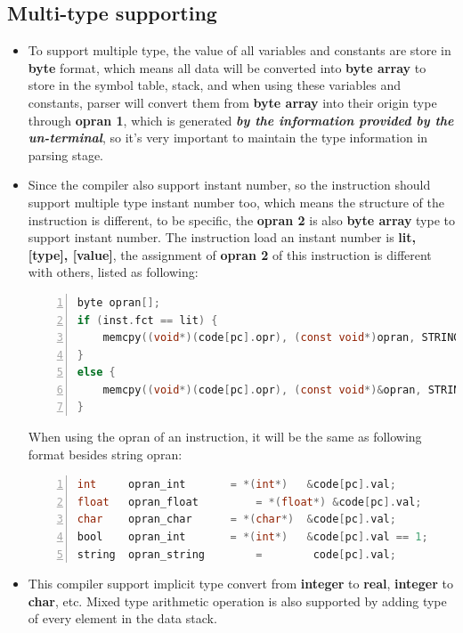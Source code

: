 \documentclass{article}
\begin{document}
		\subsection{Multi-type supporting}
		\begin{itemize}
		\item To support multiple type, the value of all variables and constants are store in \textbf{byte} format, which means all data will be converted into \textbf{byte array} to store in the symbol table, stack, and when using these variables and constants, parser will convert them from \textbf{byte array} into their origin type through \textbf{opran 1}, which is generated \textbf{\emph{by the information provided by the un-terminal}}, so it's very important to maintain the type information in parsing stage.\\
		\item Since the compiler also support instant number, so the instruction should support multiple type instant number too, which means the structure of the instruction is different, to be specific, the \textbf{opran 2} is also \textbf{byte array} type to support instant number. The instruction load an instant number is \textbf{lit, [type], [value]}, the assignment of \textbf{opran 2} of this instruction is different with others, listed as following:\\
		\begin{lstlisting}[language={C},numbers=left,numberstyle=\tiny,%frame=shadowbox,  
   rulesepcolor=\color{red!20!green!20!blue!20},  
   keywordstyle=\color{blue!70!black},  
   commentstyle=\color{blue!90!},  
   basicstyle=\ttfamily]  
byte opran[];
if (inst.fct == lit) {
	memcpy((void*)(code[pc].opr), (const void*)opran, STRING_LEN);
}
else {
	memcpy((void*)(code[pc].opr), (const void*)&opran, STRING_LEN);
}
		\end{lstlisting}
		When using the opran of an instruction, it will be the same as following format besides string opran:\\
		\begin{lstlisting}[language={C},numbers=left,numberstyle=\tiny,%frame=shadowbox,  
   rulesepcolor=\color{red!20!green!20!blue!20},  
   keywordstyle=\color{blue!70!black},  
   commentstyle=\color{blue!90!},  
   basicstyle=\ttfamily]  
int 	opran_int 		= *(int*)	&code[pc].val;
float 	opran_float 		= *(float*)	&code[pc].val;
char 	opran_char 		= *(char*)	&code[pc].val;
bool 	opran_int 		= *(int*)	&code[pc].val == 1;
string 	opran_string 		= 		 code[pc].val;
		\end{lstlisting}
		\item This compiler support implicit type convert from \textbf{integer} to \textbf{real}, \textbf{integer} to \textbf{char}, etc. Mixed type arithmetic operation is also supported by adding type of every element in the data stack.
		\end{itemize}
\end{document}
